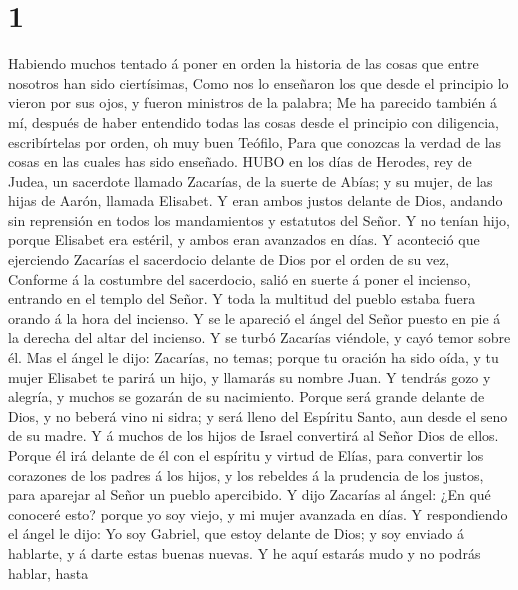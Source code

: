 \hypertarget{section}{%
\section{1}\label{section}}

 Habiendo muchos tentado á poner en orden la historia de las
cosas que entre nosotros han sido ciertísimas,  Como nos lo
enseñaron los que desde el principio lo vieron por sus ojos, y fueron
ministros de la palabra;  Me ha parecido también á mí,
después de haber entendido todas las cosas desde el principio con
diligencia, escribírtelas por orden, oh muy buen Teófilo, 
Para que conozcas la verdad de las cosas en las cuales has sido
enseñado.  HUBO en los días de Herodes, rey de Judea, un
sacerdote llamado Zacarías, de la suerte de Abías; y su mujer, de las
hijas de Aarón, llamada Elisabet.  Y eran ambos justos
delante de Dios, andando sin reprensión en todos los mandamientos y
estatutos del Señor.  Y no tenían hijo, porque Elisabet era
estéril, y ambos eran avanzados en días.  Y aconteció que
ejerciendo Zacarías el sacerdocio delante de Dios por el orden de su
vez,  Conforme á la costumbre del sacerdocio, salió en
suerte á poner el incienso, entrando en el templo del Señor.
 Y toda la multitud del pueblo estaba fuera orando á la
hora del incienso.  Y se le apareció el ángel del Señor
puesto en pie á la derecha del altar del incienso.  Y se
turbó Zacarías viéndole, y cayó temor sobre él.  Mas el
ángel le dijo: Zacarías, no temas; porque tu oración ha sido oída, y tu
mujer Elisabet te parirá un hijo, y llamarás su nombre Juan.
 Y tendrás gozo y alegría, y muchos se gozarán de su
nacimiento.  Porque será grande delante de Dios, y no
beberá vino ni sidra; y será lleno del Espíritu Santo, aun desde el seno
de su madre.  Y á muchos de los hijos de Israel convertirá
al Señor Dios de ellos.  Porque él irá delante de él con el
espíritu y virtud de Elías, para convertir los corazones de los padres á
los hijos, y los rebeldes á la prudencia de los justos, para aparejar al
Señor un pueblo apercibido.  Y dijo Zacarías al ángel: ¿En
qué conoceré esto? porque yo soy viejo, y mi mujer avanzada en días.
 Y respondiendo el ángel le dijo: Yo soy Gabriel, que estoy
delante de Dios; y soy enviado á hablarte, y á darte estas buenas
nuevas.  Y he aquí estarás mudo y no podrás hablar, hasta
